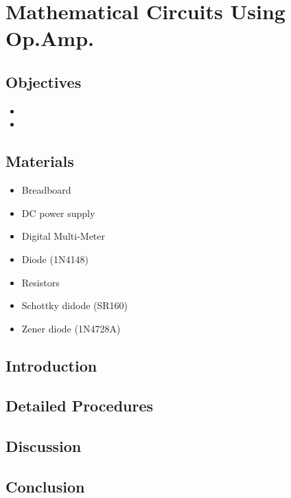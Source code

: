 \chapter{Mathematical Circuits Using Op.Amp.}


\section{Objectives}
\begin{itemize}
    \item 
    \item 
\end{itemize}

\section{Materials}
\begin{itemize}
    \item Breadboard
    \item DC power supply
    \item Digital Multi-Meter
    \item Diode (1N4148)
    \item Resistors
    \item Schottky didode (SR160)
    \item Zener diode (1N4728A)
\end{itemize}

\section{Introduction}


\section{Detailed Procedures}


\section{Discussion}


\section{Conclusion}